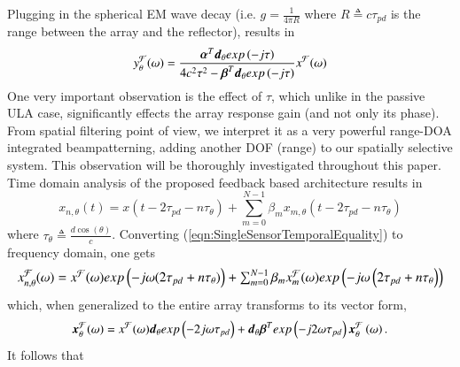     Plugging in the spherical EM wave decay (i.e. $g = \frac{1}{4\pi{}R}$ where $R\triangleq{}c\tau_{pd}$ is the range between the array and the reflector), results in
    \begin{equation}
    \label{eqn:GeneralFeedbackTransferFunction_sphericalDecay}
    y_{\theta}^{\mathcal{F}}(\omega) 
    =
    \frac{    
    \vecnot{\alpha}^{T}\vecnot{d}_{\theta}exp\left(-j\tau\right)
    }{
    4c^{2}\tau^{2} - \vecnot{\beta}^{T}\vecnot{d}_{\theta}exp\left(-j\tau\right)
    }
    x^{\mathcal{F}}(\omega)
    \end{equation}
    One very important observation is the effect of $\tau$, which unlike in the passive ULA case, significantly effects the array response gain (and not only its phase).
    From spatial filtering point of view, we interpret it as a very powerful range-DOA integrated beampatterning, adding another DOF (range) to our spatially selective system.
    This observation will be thoroughly investigated throughout this paper.
\else
    Time domain analysis of the proposed feedback based architecture results in 
    \begin{equation}
        \label{eqn:SingleSensorTemporalEquality}
        x_{n,\theta}(t) = x\left(t-2\tau_{pd}-n\tau_{\theta}\right)+\sum_{m=0}^{N-1}{\beta_{m}x_{m,\theta}(t-2\tau_{pd}-n\tau_{\theta})}
    \end{equation}
    where $\tau_{\theta} \triangleq \frac{d\cos\left(\theta\right)}{c}$.
    Converting (\ref{eqn:SingleSensorTemporalEquality}) to frequency domain, one gets
    \begin{equation}
    \resizebox{\linewidth}{!}{%
            $
            x_{n,\theta}^{\mathcal{F}}(\omega) = 
            x^{\mathcal{F}}(\omega)
            exp\left(-j\omega(2\tau_{pd}+n\tau_{\theta})\right)
            +\sum_{m=0}^{N-1}
            {
            \beta_{m}x_{m}^{\mathcal{F}}(\omega)
            exp\left(-j\omega\left(2\tau_{pd}+n\tau_{\theta}\right)\right)
            } 
            $}
    \end{equation} 
    which, when generalized to the entire array transforms to its vector form,
    \begin{equation}
    \boldsymbol{x}^{\mathcal{F}}_{\theta}(\omega) = 
    x^{\mathcal{F}}(\omega)\boldsymbol{d}_{\theta}exp\left(-2j\omega\tau_{pd}\right)
    +
    \boldsymbol{d}_{\theta}\boldsymbol{\beta}^{T}exp\left(-j2\omega\tau_{pd}\right)\boldsymbol{x}_{\theta}^{\mathcal{F}}\left(\omega\right).
    \end{equation}
    It follows that
    $$
    
    $$
